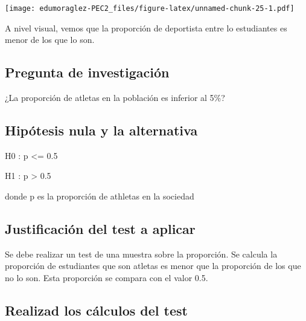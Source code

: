 \documentclass[
]{article}
\begin{document}
\texttt{[image: edumoraglez-PEC2\_files/figure-latex/unnamed-chunk-25-1.pdf]}

A nivel visual, vemos que la proporción de deportista entre lo
estudiantes es menor de los que lo son.

\hypertarget{pregunta-de-investigaciuxf3n-3}{%
\subsection{Pregunta de
investigación}\label{pregunta-de-investigaciuxf3n-3}}

¿La proporción de atletas en la población es inferior al 5\%?

\hypertarget{hipuxf3tesis-nula-y-la-alternativa-3}{%
\subsection{Hipótesis nula y la
alternativa}\label{hipuxf3tesis-nula-y-la-alternativa-3}}

H0 : p \textless= 0.5

H1 : p \textgreater{} 0.5

donde p es la proporción de athletas en la sociedad

\hypertarget{justificaciuxf3n-del-test-a-aplicar-2}{%
\subsection{Justificación del test a
aplicar}\label{justificaciuxf3n-del-test-a-aplicar-2}}

Se debe realizar un test de una muestra sobre la proporción. Se calcula
la proporción de estudiantes que son atletas es menor que la proporción
de los que no lo son. Esta proporción se compara con el valor 0.5.

\hypertarget{realizad-los-cuxe1lculos-del-test}{%
\subsection{Realizad los cálculos del
test}\label{realizad-los-cuxe1lculos-del-test}}
\end{document}
